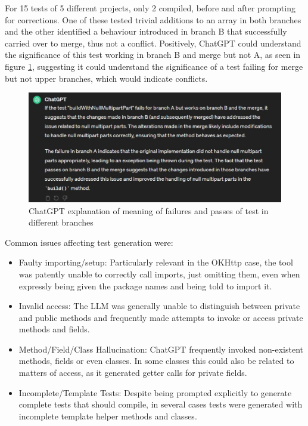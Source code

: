 For 15 tests of 5 different projects, only 2 compiled, before and after prompting for corrections. One of these tested trivial additions to an array in both branches and the other identified a behaviour introduced in branch B that successfully carried over to merge, thus not a conflict. Positively, ChatGPT could understand the significance of this test working in branch B and merge but not A, as seen in figure \ref{fig:testexplain}, suggesting it could understand the significance of a test failing for merge but not upper branches, which would indicate conflicts.

\begin{figure}
    \centering
    \includegraphics[width=1\linewidth]{figures/testexplain.jpg}
    \caption{ChatGPT explanation of meaning of failures and passes of test in different branches}
    \label{fig:testexplain}
\end{figure}

Common issues affecting test generation were:

\begin{itemize}
  \item Faulty importing/setup: Particularly relevant in the OKHttp case, the tool was patently unable to correctly call imports, just omitting them, even when expressly being given the package names and being told to import it.
  \item Invalid access: The LLM was generally unable to distinguish between private and public methods and frequently made attempts to invoke or access private methods and fields.
  \item Method/Field/Class Hallucination: ChatGPT frequently invoked non-existent methods, fields or even classes. In some classes this could also be related to matters of access, as it generated getter calls for private fields.
  \item Incomplete/Template Tests: Despite being prompted explicitly to generate complete tests that should compile, in several cases tests were generated with incomplete template helper methods and classes.
\end{itemize}

